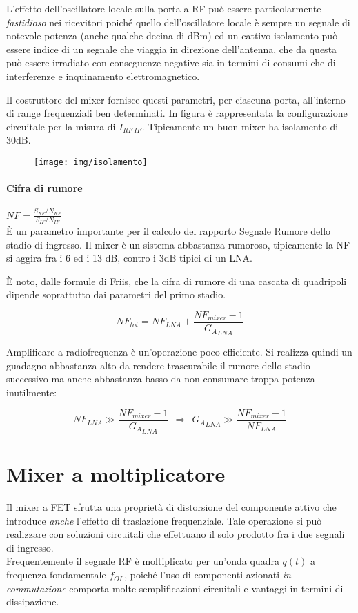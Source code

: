 L'effetto dell'oscillatore locale sulla porta a RF può essere particolarmente \textit{fastidioso} nei ricevitori poiché quello dell'oscillatore locale è sempre un segnale di notevole potenza (anche	qualche decina di dBm) ed un cattivo isolamento può	essere indice di un segnale che viaggia in direzione dell'antenna, che da questa può essere irradiato con conseguenze negative sia in termini di consumi che di interferenze e inquinamento elettromagnetico.

Il costruttore del mixer fornisce questi parametri, per ciascuna porta, all'interno di range frequenziali ben determinati. In figura è rappresentata la configurazione circuitale per la misura di $I_{RF~IF}$. Tipicamente un buon mixer ha isolamento di 30dB.

\begin{figure}[h!]
	\centering
	\texttt{[image: img/isolamento]}
	\caption{}
	\label{fig:mixer-004}
\end{figure}

\paragraph{Cifra di rumore} $NF=\frac{S_{RF}/N_{RF}}{S_{IF}/N_{IF}}$\\
È un parametro importante per il calcolo del rapporto Segnale Rumore dello stadio di ingresso. Il mixer è un sistema abbastanza rumoroso, tipicamente la NF si aggira fra i 6 ed i 13 dB, contro i 3dB tipici di un LNA.

È noto, dalle formule di Friis, che la cifra di rumore di una cascata di quadripoli dipende soprattutto dai parametri del primo stadio.

$$NF_{tot} = NF_{LNA} + \frac{NF_{mixer} - 1}{{G_A}_{LNA}}$$

Amplificare a radiofrequenza è un'operazione poco efficiente. Si realizza quindi un guadagno abbastanza alto da rendere trascurabile il rumore dello stadio successivo ma anche abbastanza basso da non consumare troppa potenza inutilmente:

$$NF_{LNA} \gg \frac{NF_{mixer} -1}{{G_A}_{LNA}}
~~ \Rightarrow ~~
{G_A}_{LNA} \gg \frac{NF_{mixer} -1}{NF_{LNA}} $$ 

\section{Mixer a moltiplicatore}
Il mixer a FET sfrutta una proprietà di distorsione del componente attivo che introduce \textit{anche} l'effetto di traslazione frequenziale. Tale operazione si può realizzare con soluzioni circuitali che effettuano il solo prodotto fra i due segnali di ingresso.\\
Frequentemente il segnale RF è moltiplicato per un'onda quadra $q(t)$ a frequenza fondamentale $f_{OL}$, poiché l'uso di componenti azionati \textit{in commutazione} comporta molte semplificazioni circuitali e vantaggi in termini di dissipazione.

